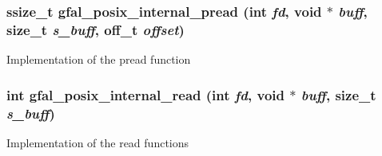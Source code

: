 \subsubsection{\setlength{\rightskip}{0pt plus 5cm}ssize\_\-t gfal\_\-posix\_\-internal\_\-pread (int {\em fd}, void $\ast$ {\em buff}, size\_\-t {\em s\_\-buff}, off\_\-t {\em offset})\hspace{0.3cm}{\tt  [inline]}}\label{gfal__posix__read_8c_c688b17ef97e9100bff37f02a8a26be2}


Implementation of the pread function 
\subsubsection{\setlength{\rightskip}{0pt plus 5cm}int gfal\_\-posix\_\-internal\_\-read (int {\em fd}, void $\ast$ {\em buff}, size\_\-t {\em s\_\-buff})\hspace{0.3cm}{\tt  [inline]}}\label{gfal__posix__read_8c_1f42df17317461c2831cd270cde9819e}


Implementation of the read functions 